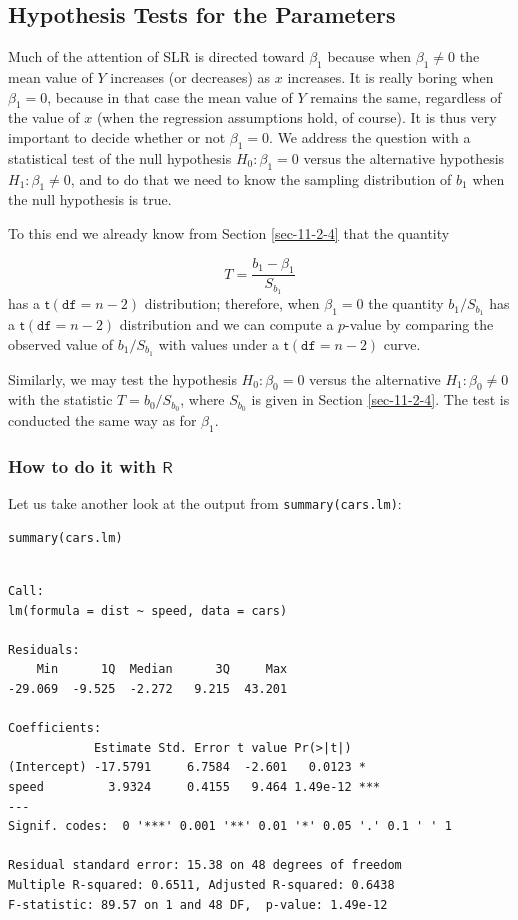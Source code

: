 \documentclass[captions=tableheading]{scrbook}
\begin{document}
\subsection{Hypothesis Tests for the Parameters}
\label{sec-11-3-1}
\label{sub-slr-hypoth-test-params}


Much of the attention of SLR is directed toward \(\beta_{1}\) because when \( \beta_{1}\neq 0 \) the mean value of \(Y\) increases (or decreases) as \(x\) increases. It is really boring when \(\beta_{1}=0\), because in that case the mean value of \(Y\) remains the same, regardless of the value of \(x\) (when the regression assumptions hold, of course). It is thus very important to decide whether or not \( \beta_{1} = 0 \). We address the question with a statistical test of the null hypothesis \(H_{0}:\beta_{1}=0\) versus the alternative hypothesis \(H_{1}:\beta_{1}\neq0\), and to do that we need to know the sampling distribution of \(b_{1}\) when the null hypothesis is true.

To this end we already know from Section \ref{sec-11-2-4} that the quantity

\begin{equation} 
T=\frac{b_{1}-\beta_{1}}{S_{b_{1}}}
\end{equation}
has a \(\mathsf{t}(\mathtt{df}=n-2)\) distribution; therefore, when \(\beta_{1}=0\) the quantity \(b_{1}/S_{b_{1}}\) has a \(\mathsf{t}(\mathtt{df}=n-2)\) distribution and we can compute a \(p\)-value by comparing the observed value of \(b_{1}/S{}_{b_{1}}\) with values under a \(\mathsf{t}(\mathtt{df}=n-2)\) curve. 

Similarly, we may test the hypothesis \(H_{0}:\beta_{0}=0\) versus the alternative \(H_{1}:\beta_{0}\neq0\) with the statistic \(T=b_{0}/S_{b_{0}}\), where \(S_{b_{0}}\) is given in Section \ref{sec-11-2-4}. The test is conducted the same way as for \(\beta_{1}\). 
\subsubsection{How to do it with \(\mathsf{R}\)}
\label{sec-11-3-1-1}


Let us take another look at the output from \texttt{summary(cars.lm)}:


\begin{verbatim}
summary(cars.lm)
\end{verbatim}


\begin{verbatim}

Call:
lm(formula = dist ~ speed, data = cars)

Residuals:
    Min      1Q  Median      3Q     Max 
-29.069  -9.525  -2.272   9.215  43.201 

Coefficients:
            Estimate Std. Error t value Pr(>|t|)    
(Intercept) -17.5791     6.7584  -2.601   0.0123 *  
speed         3.9324     0.4155   9.464 1.49e-12 ***
---
Signif. codes:  0 '***' 0.001 '**' 0.01 '*' 0.05 '.' 0.1 ' ' 1 

Residual standard error: 15.38 on 48 degrees of freedom
Multiple R-squared: 0.6511,	Adjusted R-squared: 0.6438 
F-statistic: 89.57 on 1 and 48 DF,  p-value: 1.49e-12
\end{verbatim}
\end{document}
